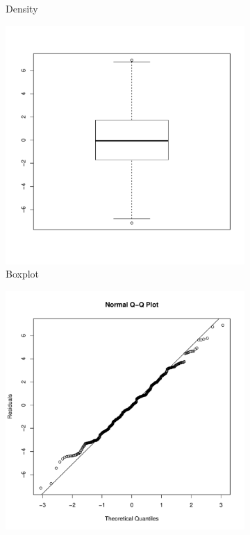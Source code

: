 \documentclass[11pt,openany]{book}\usepackage[]{graphicx}\usepackage[]{color}
\begin{document}
\begin{figure}
\begin{subfigure}[b]{0.4\textwidth}
                \caption{Density \label{fig:multresidden}}
        \end{subfigure}
        \begin{subfigure}[b]{0.4\textwidth}
                \centering
                \includegraphics[width=\textwidth]{15_Diagnostics/multresidbox.pdf} %
                \caption{Boxplot \label{fig:multresidbox}}
        \end{subfigure}
        \begin{subfigure}[b]{0.4\textwidth}
                \centering
                \includegraphics[width=\textwidth]{15_Diagnostics/multresidqq.pdf} %

\end{subfigure}
\end{figure}
\end{document}
